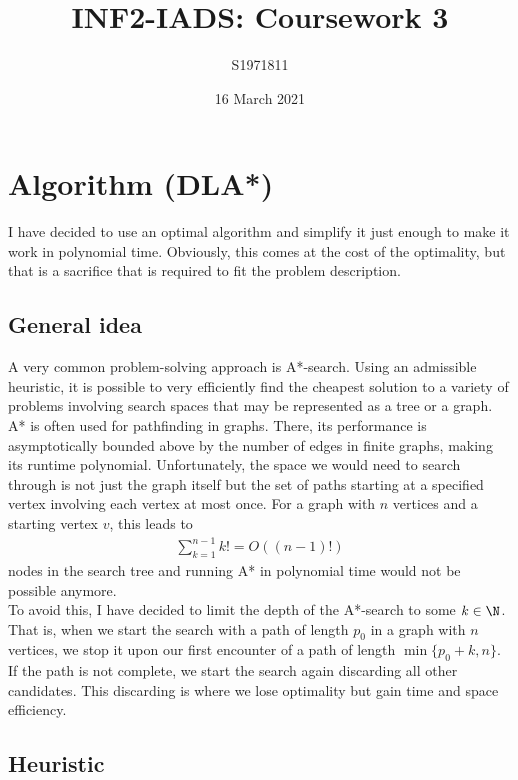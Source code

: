 \documentclass{article}
\title{INF2-IADS: Coursework 3}
\author{S1971811}
\date{16 March 2021}
\begin{document}
\maketitle

\section{Algorithm (DLA*)}

I have decided to use an optimal algorithm and simplify it just enough to make it
work in polynomial time. Obviously, this comes at the cost of the optimality, but
that is a sacrifice that is required to fit the problem description.

\subsection{General idea}

A very common problem-solving approach is A*-search. Using an admissible heuristic,
it is possible to very efficiently find the cheapest solution to a variety of problems
involving search spaces that may be represented as a tree or a graph.
A* is often used for pathfinding in graphs. There, its performance is asymptotically
bounded above by the number of edges in finite graphs, making its runtime polynomial.
Unfortunately, the space we would need to search through is not just the graph itself
but the set of paths starting at a specified vertex involving each vertex at most once.
For a graph with $n$ vertices and a starting vertex $v$, this leads to
\begin{align*}
	\sum_{k=1}^{n-1} k! = O((n-1)!)
\end{align*}
nodes in the search tree and running A* in polynomial time would not be
possible anymore.\\
To avoid this, I have decided to limit the depth of the A*-search to some $k\in\N$.
That is, when we start the search with a path of length $p_0$ in a graph with $n$
vertices, we stop it upon our first encounter of a path of length $\min\{p_0+k, n\}$.
If the path is not complete, we start the search again discarding all other
candidates. This discarding is where we lose optimality but gain time and space
efficiency.

\subsection{Heuristic}
\end{document}
